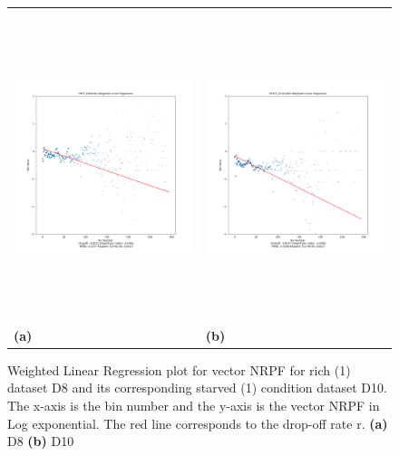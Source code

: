 \documentclass[a4,center,fleqn]{NAR}
\begin{document}
\begin{figure} [ht]
\centering
\begin{tabular}{ll}
\includegraphics[width=9cm,height=9cm]{D8FP_D8mRNA.Log.WLR.png} & \includegraphics[width=9cm,height=9cm]{D10FP_D10mRNA.Log.WLR.png} \\
\textbf{(a)}   & \textbf{(b)}     \\[0.1pt]
\end{tabular}
\caption{Weighted Linear Regression plot for vector NRPF for rich (1)  dataset D8 and its corresponding starved (1) condition dataset D10. The x-axis is the bin number and the y-axis is the vector NRPF in Log exponential. The red line corresponds to the drop-off rate r.
\textbf{(a)} D8
\textbf{(b)} D10
}
\label{fig5}
\end{figure} 
\end{document}
